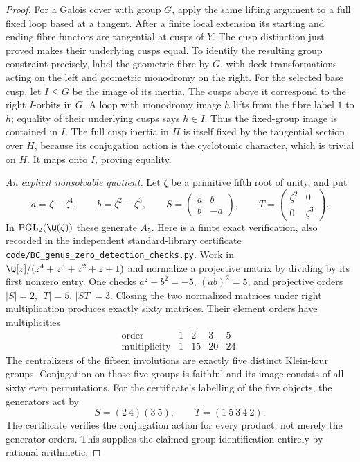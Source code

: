 \begin{proof}
For a Galois cover with group $G$, apply the same lifting argument
to a full fixed loop based at a tangent. After a finite local
extension its starting and ending fibre functors are tangential at
cusps of $Y$. The cusp distinction just proved makes their underlying
cusps equal. To identify the resulting group constraint precisely,
label the geometric fibre by $G$, with deck transformations acting on
the left and geometric monodromy on the right. For the selected
base cusp, let $I\le G$ be the image of its inertia. The cusps
above it correspond to the right $I$-orbits in $G$. A loop with
monodromy image $h$ lifts from the fibre label $1$ to $h$; equality
of their underlying cusps says $h\in I$. Thus the fixed-group
image is contained in $I$. The full cusp inertia in $\Pi$ is
itself fixed by the tangential section over $H$, because its
conjugation action is the cyclotomic character, which is trivial
on $H$. It maps onto $I$, proving equality.

\emph{An explicit nonsolvable quotient.}
Let $\zeta$ be a primitive fifth root of unity, and put
\[
 a=\zeta-\zeta^4,\qquad b=\zeta^2-\zeta^3,\qquad
 S=\begin{pmatrix}a&b\\b&-a\end{pmatrix},\qquad
 T=\begin{pmatrix}\zeta^2&0\\0&\zeta^3\end{pmatrix}.
                                                               \tag{C.7d.4}
\]
In $\operatorname{PGL}_2(\Q(\zeta))$ these generate $A_5$.
Here is a finite exact verification, also recorded in the independent
standard-library certificate
\texttt{code/BC\_genus\_zero\_detection\_checks.py}.
Work in $\Q[z]/(z^4+z^3+z^2+z+1)$ and normalize a projective
matrix by dividing by its first nonzero entry. One checks
$a^2+b^2=-5$, $(ab)^2=5$, and projective orders
$|S|=2$, $|T|=5$, $|ST|=3$. Closing the two normalized
matrices under right multiplication produces exactly sixty matrices.
Their element orders have multiplicities
\[
  \begin{array}{c|rrrr}
    \text{order}&1&2&3&5\\ \hline
    \text{multiplicity}&1&15&20&24.
  \end{array}
\]
The centralizers of the fifteen involutions are exactly five distinct
Klein-four groups. Conjugation on those five groups is faithful
and its image consists of all sixty even permutations. For the
certificate's labelling of the five objects, the generators act by
\[
     S=(2\ 4)(3\ 5),\qquad T=(1\ 5\ 3\ 4\ 2).
                                                               \tag{C.7d.5}
\]
The certificate verifies the conjugation action for every product,
not merely the generator orders. This supplies the claimed group
identification entirely by rational arithmetic.


\end{proof}
